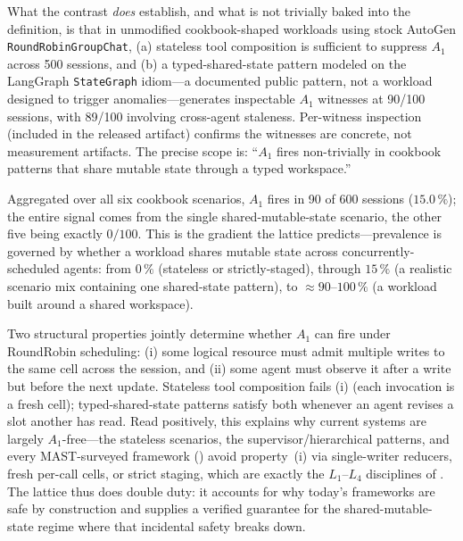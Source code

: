 \documentclass[journal,compsoc,10pt]{IEEEtran}
\theoremstyle{definition}
\theoremstyle{remark}
\begin{document}
What the contrast \emph{does} establish, and what is not
trivially baked into the definition, is that in unmodified
cookbook-shaped workloads using stock AutoGen
\texttt{RoundRobinGroupChat}, (a) stateless tool composition
is sufficient to suppress $A_1$ across 500 sessions, and (b)
a typed-shared-state pattern modeled on the LangGraph
\texttt{StateGraph} idiom---a documented public pattern, not
a workload designed to trigger anomalies---generates
inspectable $A_1$ witnesses at 90/100 sessions, with 89/100
involving cross-agent staleness. Per-witness inspection
(included in the released artifact) confirms the witnesses
are concrete, not measurement artifacts. The precise scope is:
``$A_1$ fires non-trivially in cookbook patterns that share
mutable state through a typed workspace.''

Aggregated over all six cookbook scenarios, $A_1$ fires in 90 of 600
sessions ($15.0\,\%$); the entire signal comes from the single
shared-mutable-state scenario, the other five being exactly $0/100$. This
is the gradient the lattice predicts---prevalence is governed by whether a
workload shares mutable state across concurrently-scheduled agents: from
$0\,\%$ (stateless or strictly-staged), through $15\,\%$ (a realistic
scenario mix containing one shared-state pattern), to $\approx 90$--$100\,\%$
(a workload built around a shared workspace).

Two structural properties jointly determine whether $A_1$ can fire under
RoundRobin scheduling: (i) some logical resource must admit multiple
writes to the same cell across the session, and (ii) some agent must
observe it after a write but before the next update. Stateless tool
composition fails (i) (each invocation is a fresh cell); typed-shared-state
patterns satisfy both whenever an agent revises a slot another has read.
Read positively, this explains why current systems are largely
$A_1$-free---the stateless scenarios, the supervisor/hierarchical
patterns, and every MAST-surveyed framework ()
avoid property~(i) via single-writer reducers, fresh per-call cells, or
strict staging, which are exactly the $L_1$--$L_4$ disciplines of
. The lattice thus does double duty: it accounts for why
today's frameworks are safe by construction and supplies a verified
guarantee for the shared-mutable-state regime where that incidental safety
breaks down.
\end{document}
